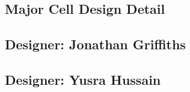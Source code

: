 \documentclass[11pt,a4paper]{article} %
\begin{document}
\begin{appendices}
 \newpage
\section{Major Cell Design Detail}
\newpage
\subsection{Designer: Jonathan Griffiths\\} %
%
%
\newpage

\subsection{Designer: Yusra Hussain\\} %
%
%

\end{appendices}

\newpage

%
%



\end{document}
